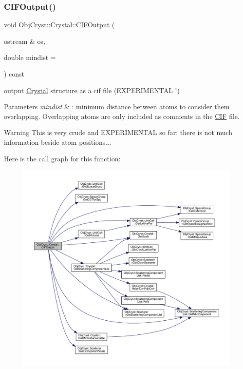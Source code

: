 \subsubsection{\texorpdfstring{CIFOutput()}{CIFOutput()}}
{\footnotesize\ttfamily void Obj\+Cryst\+::\+Crystal\+::\+C\+I\+F\+Output (\begin{DoxyParamCaption}\item[{ostream \&}]{os,  }\item[{double}]{mindist = {} }\end{DoxyParamCaption}) const\hspace{0.3cm}{\ttfamily [virtual]}}



output \mbox{\hyperlink{class_obj_cryst_1_1_crystal}{Crystal}} structure as a cif file (E\+X\+P\+E\+R\+I\+M\+E\+N\+T\+AL !) 


\begin{DoxyParams}{Parameters}
{\em mindist} & \+: minimum distance between atoms to consider them overlapping. Overlapping atoms are only included as comments in the \mbox{\hyperlink{class_obj_cryst_1_1_c_i_f}{C\+IF}} file.\\
\hline
\end{DoxyParams}
\begin{DoxyWarning}{Warning}
This is very crude and E\+X\+P\+E\+R\+I\+M\+E\+N\+T\+AL so far\+: there is not much information beside atom positions... 
\end{DoxyWarning}
Here is the call graph for this function\+:
\nopagebreak
\begin{figure}[H]
\begin{center}
\leavevmode
\includegraphics[width=350pt]{class_obj_cryst_1_1_crystal_a12969ab06ecb5293c57fb305e146cc72_cgraph}
\end{center}
\end{figure}
\mbox{\label{class_obj_cryst_1_1_crystal_a6e7bc69bcb5331e8faf60ef13db1255c}} 
